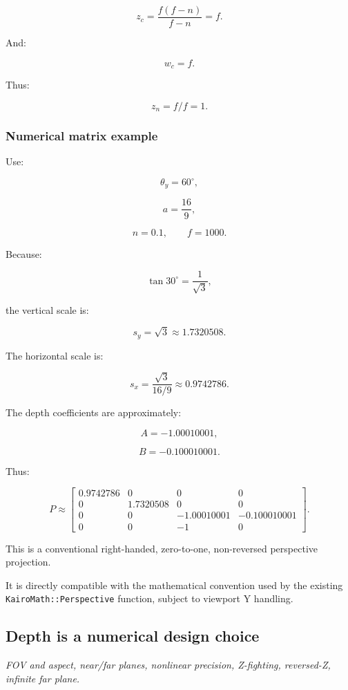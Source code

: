 \[
 z_c= \frac{f(f-n)}{f-n}=f.
\]

And:

\[
 w_c=f.
\]

Thus:

\[
 \boxed{z_n=f/f=1}.
\]

\subsubsection{Numerical matrix example}\label{numerical-matrix-example}

Use:

\[
 \theta_y=60^\circ,
\]

\[
 a=\frac{16}{9},
\]

\[
 n=0.1,\qquad f=1000.
\]

Because:

\[
 \tan30^\circ=\frac1{\sqrt3},
\]

the vertical scale is:

\[
 s_y=\sqrt3\approx1.7320508.
\]

The horizontal scale is:

\[
 s_x=\frac{\sqrt3}{16/9} \approx0.9742786.
\]

The depth coefficients are approximately:

\[
 A=-1.00010001,
\]

\[
 B=-0.100010001.
\]

Thus:

\[
 \boxed{ P\approx \begin{bmatrix} 0.9742786&0&0&0\\ 0&1.7320508&0&0\\ 0&0&-1.00010001&-0.100010001\\ 0&0&-1&0 \end{bmatrix} }.
\]

This is a conventional right-handed, zero-to-one, non-reversed perspective projection.

It is directly compatible with the mathematical convention used by the existing \texttt{KairoMath::Perspective} function, subject to viewport Y handling.

\subsection{Depth is a numerical design choice}\label{depth-is-a-numerical-design-choice}

\emph{FOV and aspect, near/far planes, nonlinear precision, Z-fighting, reversed-Z, infinite far plane.}


